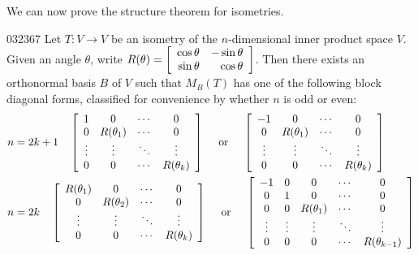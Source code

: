 We can now prove the structure theorem for isometries.

\begin{theorem}{}{032367}
Let $T : V \to V$ be an isometry of the $n$-dimensional inner product space $V$. Given an angle $\theta$, write $R(\theta) = 
\left[ \begin{array}{rr}
\cos \theta & - \sin \theta \\
\sin \theta & \cos \theta
\end{array} \right]$. Then there exists an orthonormal basis $B$ of $V$ such that $M_{B}(T)$ has one of the following block diagonal forms, classified for convenience by whether $n$ is odd or even:
\begin{align*}
n &= 2k + 1  \quad
\left[ \begin{array}{cccc}
1 & 0 			& \cdots & 0 \\
0 & R(\theta_1) & \cdots & 0 \\
\vdots & \vdots & \ddots & \vdots \\
0 & 0 & \cdots & R(\theta_k)
\end{array} \right] \quad 
\mbox{ or } \quad 
\left[ \begin{array}{cccc}
-1 & 0 			& \cdots & 0 \\
0 & R(\theta_1) & \cdots & 0 \\
\vdots & \vdots & \ddots & \vdots \\
0 & 0 & \cdots & R(\theta_k)
\end{array} \right] \\
n &= 2k \quad 
\left[ \begin{array}{cccc}
R(\theta_1) & 0 			& \cdots & 0 \\
0 & R(\theta_2) & \cdots & 0 \\
\vdots & \vdots & \ddots & \vdots \\
0 & 0 & \cdots & R(\theta_k)
\end{array} \right] \quad
\mbox{ or } \quad
\left[ \begin{array}{ccccc}
-1 & 0 & 0			& \cdots & 0 \\
0 & 1 & 0 			& \cdots & 0 \\
0 & 0 & R(\theta_1) & \cdots & 0 \\
\vdots & \vdots & \vdots & \ddots & \vdots \\
0 & 0 & 0 			& \cdots & R(\theta_{k - 1})
\end{array} \right]
\end{align*}
\end{theorem}

